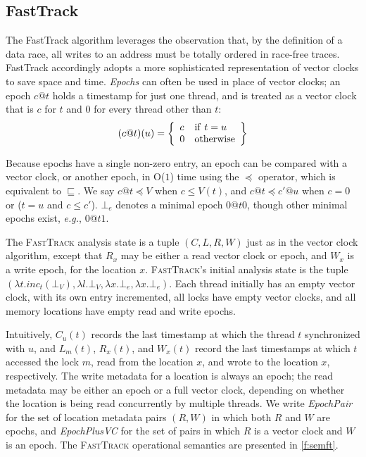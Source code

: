 \documentclass[preprint, 10pt]{sigplanconf}
\newcommand{\eg}{\textit{e.g.}\xspace}
\newcommand{\FT}{\textsc{FastTrack}\xspace}
\newcommand{\Constant}{O($1$)\xspace}
\newcommand{\EpochPair}{\textit{EpochPair}\xspace}
\newcommand{\EpochVC}{\textit{EpochPlusVC}\xspace}
\newcommand{\VCCompare}{\sqsubseteq}
\newcommand{\EpochCompare}{\preceq}
\begin{document}
\subsection{FastTrack}


The FastTrack algorithm \cite{fasttrack} leverages the observation that, by the definition of a data race, all writes to an address must be totally ordered in race-free traces. FastTrack accordingly adopts a more sophisticated representation of vector clocks to save space and time.
\emph{Epochs} can often be used in place of vector clocks; an epoch $c@t$  holds a timestamp for just one thread, and is treated as a vector clock that is $c$ for $t$ and 0 for every thread other than $t$:
\[
(c@t)(u) = 
\left\{
  \begin{array}[c]{ll}
   c & \mathrm{if}\ t = u \\
   0 & \mathrm{otherwise}
  \end{array}
  \right\}
\]

Because epochs have a single non-zero entry, an epoch can be compared with a vector clock, or another epoch, in \Constant time using the $\EpochCompare$ operator, which is equivalent to $\VCCompare$. We say $c@t \EpochCompare V$ when $c \leq V(t)$, and $c@t \EpochCompare c'@u$ when $c = 0$ or ($t = u$ and $c \leq c'$).
$\bot_e$ denotes a minimal epoch $0@t0$, though other minimal epochs exist, \eg, $0@t1$.

The \FT analysis state is a tuple $(C, L, R, W)$ just as in the vector clock algorithm, except that $R_x$ may be either a read vector clock or epoch, and $W_x$ is a write epoch, for the location $x$. \FT's initial analysis state is the tuple $(\lambda t.inc_t(\bot_V), \lambda l.\bot_V , \lambda x. \bot_e, \lambda x. \bot_e)$. Each thread initially has an empty vector clock, with its own entry incremented, all locks have empty vector clocks, and all memory locations have empty read and write epochs. 

Intuitively, $C_u(t)$ records the last timestamp at which the thread $t$ synchronized with $u$, and $L_m(t)$, $R_x(t)$, and $W_x(t)$ record the last timestamps at which $t$ accessed the lock $m$, read from the location $x$, and wrote to the location $x$, respectively. The write metadata for a location is always an epoch; the read metadata may be either an epoch or a full vector clock, depending on whether the location is being read concurrently by multiple threads. We write \EpochPair for the set of location metadata pairs $(R, W)$ in which both $R$ and $W$ are epochs, and \EpochVC for the set of pairs in which $R$ is a vector clock and $W$ is an epoch. The \FT operational semantics are presented in \autoref{f:semft}.
\end{document}
